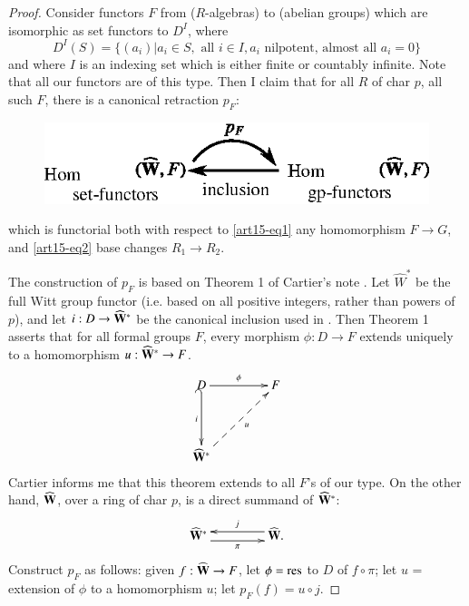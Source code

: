 \begin{proof}
Consider functors $F$ from ($R$-algebras) to (abelian groups) which are isomorphic as set functors to $D^{I}$, where
$$
D^{I}(S)=\{(a_{i})|a_{i}\in S,\text{ all } i\in I, a_{i}\text{ nilpotent, almost all } a_{i}=0\}
$$
and where $I$ is an indexing set which is either finite or countably infinite. Note that all our functors are of this type. Then I claim that for all $R$ of char $p$, all such $F$, there is a canonical retraction $p_{F}$:
\begin{figure}[H]
\centering
\includegraphics{src/chap15/fig3.eps}
\end{figure}\pageoriginale
which is functorial both with respect to \eqref{art15-eq1} any homomorphism $F\to G$, and \eqref{art15-eq2} base changes $R_{1}\to R_{2}$.

The construction of $p_{F}$ is based on Theorem 1 of Cartier's note \cite{art15-key1}. Let $\widehat{W}^{*}$ be the full Witt group functor (i.e. based on all positive integers, rather than powers of $p$), and let $i:D\to \widehat{\mathbf{W}}^{*}$ be the canonical inclusion used in \cite{art15-key1}. Then Theorem 1 asserts that for all formal groups $F$, every morphism $\phi:D\to F$ extends uniquely to a homomorphism $u:\widehat{\mathbf{W}}^{*}\to F$.
\[
\xymatrix@=1.5cm{
D\ar[r]^-{\phi}\ar@{_(->}[d]_-{i} & F\\
\widehat{\bfW}^{*}\ar@{-->}[ur]_-{u}
}
\]
Cartier informs me that this theorem extends to all $F$'s of our type. On the other hand, $\widehat{\mathbf{W}}$, over a ring of char $p$, is a direct summand of $\widehat{\mathbf{W}}^{*}$:
\[
\xymatrix@C=1.5cm{
\widehat{\bfW}^{*}\ar@<-.3pc>[r]_-{\pi} & \widehat{\bfW}\ar@<-.3pc>[l]_{j}.
}
\]
Construct $p_{F}$ as follows: given $f:\widehat{\mathbf{W}}\to F$, let $\phi=\operatorname{\mathrm{res}}$ to $D$ of $f\circ \pi$; let $u$ = extension of $\phi$ to a homomorphism $u$; let $p_{F}(f)=u\circ j$.


\end{proof}
